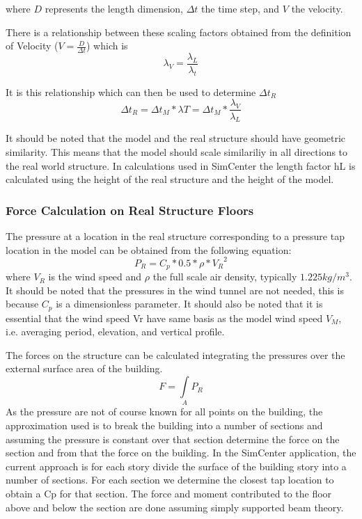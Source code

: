 where $D$ represents the length dimension, $\Delta t$ the time step, and $V$ the velocity.

There is a relationship between these scaling factors obtained from the definition of Velocity ($V = \frac{D}{\Delta t}$) which is
\[
 \lambda_V =\frac{\lambda_ L}{\lambda_t}
 \]

It is this relationship which can then be used to determine $\Delta t_R$
\[
\Delta t_R = \Delta t_M *  \lambda T = \Delta t_M * \frac{\lambda_V}{\lambda_L}
\]

It should be noted that the model and the real structure should have geometric similarity. This means that the model should scale similariliy in all directions to the real world structure. In calculations used in SimCenter the length factor hL is calculated using the height of the real structure and the height of the model.

\subsubsection{Force Calculation on Real Structure Floors}

The pressure at a location in the real structure corresponding to a pressure tap location in the model can be obtained from
the following equation:
\[
P_R = C_p * 0.5*\rho * {V_R}^2
\]
where $V_R$ is the wind speed and $\rho$ the full scale air density, typically $1.225kg/m^3$. It should be noted that the pressures in
the wind tunnel are not needed, this is because $C_p$ is a dimensionless parameter. It should also be noted that it is essential that the wind speed Vr have same basis as the model wind speed $V_M$, i.e. averaging period, elevation, and vertical profile.

The forces on the structure can be calculated integrating the pressures over the external surface area of the building.
\[
F = \int\limits_A P_R
\]
As the pressure are not of course known for all points on the building, the approximation used is to break the building into a number of sections and assuming the pressure is constant over that section determine the force on the section and from that the force on the building. In the SimCenter application, the current approach is for each story divide the surface of the building story into a number of sections. For each section we determine the closest tap location to obtain a Cp for that section. The force and moment contributed to the floor above and below the section are done assuming simply supported beam theory.


